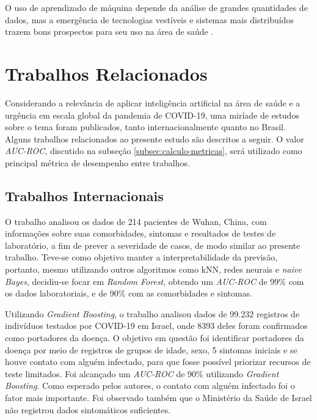 O uso de aprendizado de máquina depende da análise de grandes quantidades de dados, mas a emergência de tecnologias vestíveis e sistemas mais distribuídos trazem bons prospectos para seu uso na área de saúde \cite{wearables}.


% 






\section{Trabalhos Relacionados}
\label{sec:trabalhos}

Considerando a relevância de aplicar inteligência artificial na área de saúde e a urgência em escala global da pandemia de COVID-19, uma miríade de estudos sobre o tema foram publicados, tanto internacionalmente quanto no Brasil. Alguns trabalhos relacionados ao presente estudo são descritos a seguir. O valor \textit{AUC-ROC}, discutido na subseção \ref{subsec:calculo-metricas}, será utilizado como principal métrica de desempenho entre trabalhos.

\subsection{Trabalhos Internacionais}
\label{subsec:trabalhos-internacionais}

O trabalho \cite{yuanfang} analisou os dados de 214 pacientes de Wuhan, China, com informações sobre suas comorbidades, sintomas e resultados de testes de laboratório, a fim de prever a severidade de casos, de modo similar ao presente trabalho. Teve-se como objetivo manter a interpretabilidade da previsão, portanto, mesmo utilizando outros algoritmos como kNN, redes neurais e \textit{naive Bayes}, decidiu-se focar em \textit{Random Forest}, obtendo um \textit{AUC-ROC} de 99\% com os dados laboratoriais, e de 90\% com as comorbidades e sintomas. 

Utilizando \textit{Gradient Boosting}, o trabalho \cite{yazeed} analisou dados de 99.232 registros de indivíduos testados por COVID-19 em Israel, onde 8393 deles foram confirmados como portadores da doença. O objetivo em questão foi identificar portadores da doença por meio de registros de grupos de idade, sexo, 5 sintomas iniciais e se houve contato com alguém infectado, para que fosse possível priorizar recursos de teste limitados. Foi alcançado um \textit{AUC-ROC} de 90\% utilizando \textit{Gradient Boosting}. Como esperado pelos autores, o contato com alguém infectado foi o fator mais importante. Foi observado também que o Ministério da Saúde de Israel não registrou dados sintomáticos suficientes.


